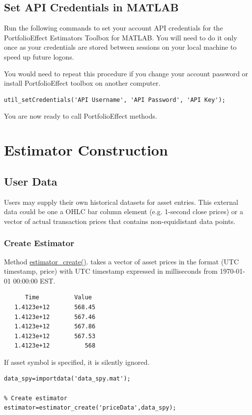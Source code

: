 \documentclass[letterpaper]{report}
\newcounter{N}
\begin{document}
\section{Set API Credentials in MATLAB} 
Run the following commands to set your account API credentials for the
PortfolioEffect Estimators Toolbox for MATLAB.
You will need to do it only once as your credentials are stored between sessions
on your local machine to speed up future logons. \par You would need to repeat
this procedure if you change your account password or install PortfolioEffect
toolbox on another computer.
\begin{lstlisting}
util_setCredentials('API Username', 'API Password', 'API Key');
\end{lstlisting}
You are now ready to call PortfolioEffect methods.

\chapter{Estimator Construction}
\section{User Data}
Users may supply their own historical datasets for asset entries. 
This external data could be one a OHLC bar column element (e.g. 1-second close prices) or a vector of actual transaction prices that contains non-equidistant data points. 
\subsection{Create Estimator}
Method
\href{https://www.portfolioeffect.com/docs/platform/quant/functions/general-functions/estimator-create}{estimator\_create()}.
takes a vector of asset prices in the format (UTC timestamp, price) with UTC
timestamp expressed in milliseconds from 1970-01-01 00:00:00 EST.
\begin{lstlisting}
      Time          Value
   1.4123e+12       568.45
   1.4123e+12       567.46
   1.4123e+12       567.86
   1.4123e+12       567.53
   1.4123e+12          568
\end{lstlisting}
If asset symbol is specified, it is silently ignored.
\begin{lstlisting}
data_spy=importdata('data_spy.mat'); 

% Create estimator
estimator=estimator_create('priceData',data_spy);
\end{lstlisting}
\end{document}
